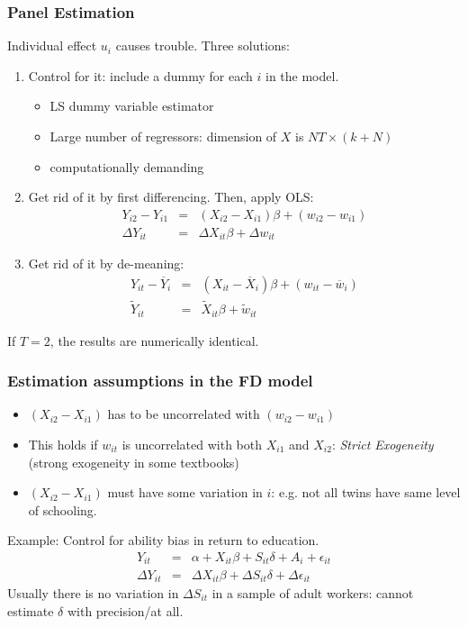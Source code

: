 \documentclass[notes=show,beamer,compress]{beamer}
\begin{document}
\begin{frame}
\frametitle{Panel Estimation}

Individual effect $u_i$ causes trouble. Three solutions:
\begin{enumerate}
	\item Control for it: include a dummy for each $i$ in the model.
	\begin{itemize}
	\item  LS dummy variable estimator
	\item Large number of regressors: dimension of  $X$ is $ NT\times (k+N) $
	\item computationally demanding
	\end {itemize}
	\item Get rid of it by first differencing. Then, apply OLS:
\begin{eqnarray*}
Y_{i2}-Y_{i1} &=& \left(X_{i2}-X_{i1}\right)\beta + \left(w_{i2}-w_{i1}\right)\\
\Delta Y_{it} &=& \Delta X_{it} \beta   + \Delta w_{it}
\end{eqnarray*}
\item Get rid of it by de-meaning:
\begin{eqnarray*}
	Y_{it}-\overline{Y}_i &=& \left(X_{it}-\overline{X}_i\right)\beta + \left(w_{it}-\overline{w}_i\right)\\
	\widetilde{Y}_{it} &=& \widetilde{X}_{it} \beta   + \widetilde{w}_{it}
\end{eqnarray*}
\end{enumerate}
If $T=2$, the results are numerically identical.
\end{frame}






\begin{frame}
\frametitle{Estimation assumptions in the FD model}
     \begin {itemize}

     \item $\left(X_{i2}-X_{i1}\right)$ has to be uncorrelated with $\left(w_{i2}-w_{i1}\right)$
     \item This holds if $w_{it}$ is uncorrelated with both  $X_{i1}$ and $X_{i2}$: \emph{Strict Exogeneity} (strong exogeneity in some textbooks)
	 \item $\left(X_{i2}-X_{i1}\right)$ must have some variation in $i$: e.g. not all twins have same level of schooling.
      \end {itemize}
Example: Control for ability bias in return to education.
\begin{eqnarray*}
Y_{it}& = &\alpha + X_{it}\beta + S_{it}\delta+ A_i + \epsilon_{it} \\
\Delta Y_{it} &= & \Delta X_{it}\beta + \Delta S_{it}\delta+  \Delta \epsilon_{it}
\end{eqnarray*}
 Usually there is no variation in $\Delta S_{it}$ in a sample of adult workers: cannot estimate $\delta$ with precision/at all.

\end{frame}
\end{document}
